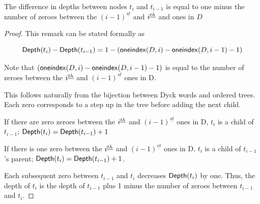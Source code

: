 \begin{remark} The difference in depths between nodes $t_i$ and $t_{i-1}$ is equal to one minus the number of zeroes between the $(i-1)^{\underline{st}}$ and $i^{\underline{th}}$ and  ones in $D$


\end{remark}
\begin{proof}

    This remark can be stated formally as 

    \begin{equation} \label{eq:depthformula} 
    	\mathsf{Depth}{(t_i)} - \mathsf{Depth}{(t_{i-1})}=1-(\mathsf{oneindex}({D}, i)-\mathsf{oneindex}({D}, i-1) - 1) 
    \end{equation}
    


    

    Note that $(\mathsf{oneindex}({D}, i)-\mathsf{oneindex}({D}, i-1)-1)$ is equal to the number of zeroes between the $i^{\underline{th}}$ and $(i-1)^{\underline{st}}$ ones in D.  %



    This follows naturally from the bijection between Dyck words and ordered trees.  Each zero corresponds to a step up in the tree before adding the next child.  

    If there are zero zeroes between the $i^{\underline{th}}$  and $(i-1)^{\underline{st}}$ ones in D, $t_i$ is a child of $t_{i-1}$; $\mathsf{Depth}{(t_i)}=\mathsf{Depth}{(t_{i-1})}+1$

    If there is one zero between the $i^{\underline{th}}$  and $(i-1)^{\underline{st}}$ ones in D, $t_i$ is a child of $t_{i-1}$'s parent; $\mathsf{Depth}{(t_i)}=\mathsf{Depth}{(t_{i-1})}+1$.  

    Each subsequent zero between $t_{i-1}$ and $t_i$ decreases $\mathsf{Depth}{(t_{i})}$ by one.  Thus, the depth of $t_i$ is the depth of $t_{i-1}$ plus 1 minus the number of zeroes between $t_{i-1}$ and $t_{i}$.
\end{proof}


